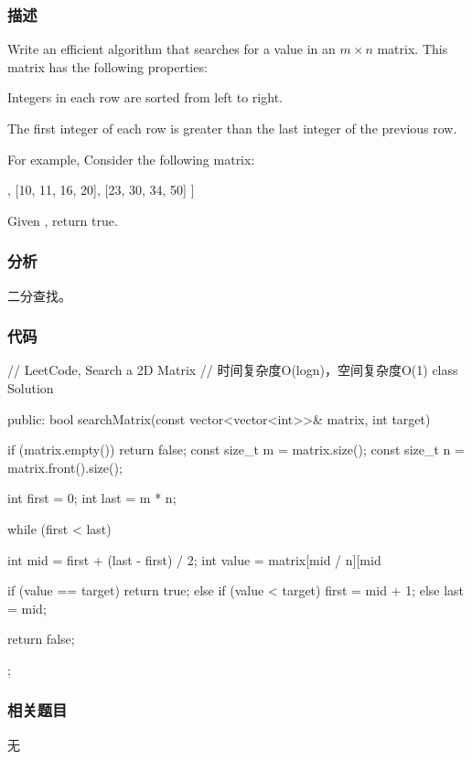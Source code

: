 \subsubsection{描述}
Write an efficient algorithm that searches for a value in an $m \times n$ matrix. This matrix has the following properties:
\begindot
\item Integers in each row are sorted from left to right.
\item The first integer of each row is greater than the last integer of the previous row.
\myenddot

For example, Consider the following matrix:
\begin{Code}
[
  [1,   3,  5,  7],
  [10, 11, 16, 20],
  [23, 30, 34, 50]
]
\end{Code}
Given , return true.


\subsubsection{分析}
二分查找。


\subsubsection{代码}
\begin{Code}
// LeetCode, Search a 2D Matrix
// 时间复杂度O(logn)，空间复杂度O(1)
class Solution {
public:
    bool searchMatrix(const vector<vector<int>>& matrix, int target) {
        if (matrix.empty()) return false;
        const size_t  m = matrix.size();
        const size_t n = matrix.front().size();

        int first = 0;
        int last = m * n;

        while (first < last) {
            int mid = first + (last - first) / 2;
            int value = matrix[mid / n][mid %

            if (value == target)
                return true;
            else if (value < target)
                first = mid + 1;
            else
                last = mid;
        }

        return false;
    }
};
\end{Code}


\subsubsection{相关题目}
\begindot
\item 无
\myenddot
